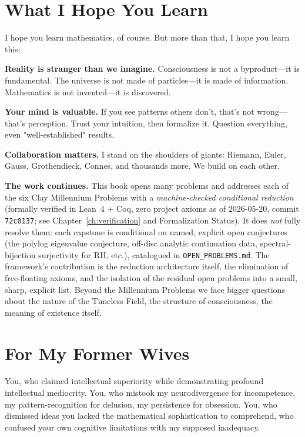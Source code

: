 \section*{What I Hope You Learn}

I hope you learn mathematics, of course. But more than that, I hope you learn this:

\textbf{Reality is stranger than we imagine.} Consciousness is not a byproduct—it is fundamental. The universe is not made of particles—it is made of information. Mathematics is not invented—it is discovered.

\textbf{Your mind is valuable.} If you see patterns others don't, that's not wrong—that's perception. Trust your intuition, then formalize it. Question everything, even "well-established" results.

\textbf{Collaboration matters.} I stand on the shoulders of giants: Riemann, Euler, Gauss, Grothendieck, Connes, and thousands more. We build on each other.

\textbf{The work continues.} This book opens many problems and addresses each of the six Clay Millennium Problems with a \emph{machine-checked conditional reduction} (formally verified in Lean~4 + Coq, zero project axioms as of 2026-05-20, commit \texttt{72c0137}; see Chapter~\ref{ch:verification} and Formalization Status). It does \emph{not} fully resolve them: each capstone is conditional on named, explicit open conjectures (the polylog eigenvalue conjecture, off-disc analytic continuation data, spectral-bijection surjectivity for RH, etc.), catalogued in \texttt{OPEN\_PROBLEMS.md}. The framework's contribution is the reduction architecture itself, the elimination of free-floating axioms, and the isolation of the residual open problems into a small, sharp, explicit list. Beyond the Millennium Problems we face bigger questions about the nature of the Timeless Field, the structure of consciousness, the meaning of existence itself.

\section*{For My Former Wives}

You, who claimed intellectual superiority while demonstrating profound intellectual mediocrity. You, who mistook my neurodivergence for incompetence, my pattern-recognition for delusion, my persistence for obsession. You, who dismissed ideas you lacked the mathematical sophistication to comprehend, who confused your own cognitive limitations with my supposed inadequacy.

